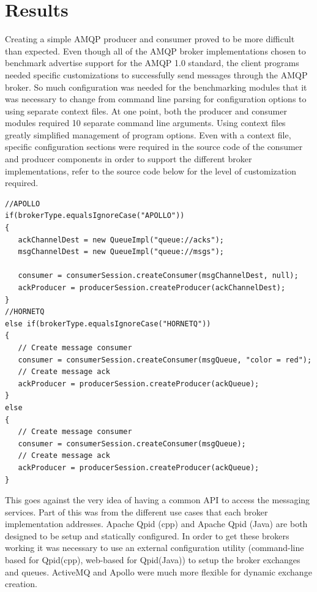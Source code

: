 \documentclass{thesis}
\begin{document}
\chapter{Results}
Creating a simple AMQP producer and consumer proved to be more difficult than expected.  Even though all of the AMQP broker implementations chosen to benchmark advertise support for the AMQP 1.0 standard, the client programs needed specific customizations to successfully send messages through the AMQP broker.   So much configuration was needed for the benchmarking modules that it was necessary to change from command line parsing for configuration options to using separate context files.  At one point, both the producer and consumer modules required 10 separate command line arguments.  Using context files greatly simplified management of program options.  Even with a context file, specific configuration sections were required in the source code of the consumer and producer components in order to support the different broker implementations, refer to the source code below for the level of customization required.

\begin{lstlisting}
//APOLLO
if(brokerType.equalsIgnoreCase("APOLLO"))
{
   ackChannelDest = new QueueImpl("queue://acks");
   msgChannelDest = new QueueImpl("queue://msgs");
        	
   consumer = consumerSession.createConsumer(msgChannelDest, null);
   ackProducer = producerSession.createProducer(ackChannelDest);
}
//HORNETQ
else if(brokerType.equalsIgnoreCase("HORNETQ"))
{
   // Create message consumer
   consumer = consumerSession.createConsumer(msgQueue, "color = red");
   // Create message ack
   ackProducer = producerSession.createProducer(ackQueue);
}
else
{
   // Create message consumer
   consumer = consumerSession.createConsumer(msgQueue);
   // Create message ack
   ackProducer = producerSession.createProducer(ackQueue);
}
\end{lstlisting}

This goes against the very idea of having a common API to access the messaging services.  Part of this was from the different use cases that each broker implementation addresses.  Apache Qpid (cpp) and Apache Qpid (Java) are both designed to be setup and statically configured.  In order to get these brokers working it was necessary to use an external configuration utility (command-line based for Qpid(cpp), web-based for Qpid(Java)) to setup the broker exchanges and queues.  ActiveMQ and Apollo were much more flexible for dynamic exchange creation.  
\end{document}
